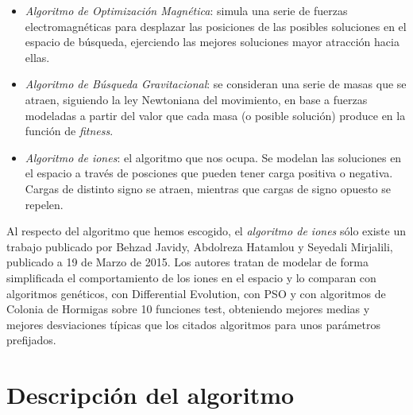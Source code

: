 \documentclass[a4paper,11pt]{article}
\begin{document}
\begin{itemize}
  \begin{itemize}
    \item \textit{Algoritmo de Optimización Magnética}: simula una serie de fuerzas electromagnéticas para desplazar las posiciones
    de las posibles soluciones en el espacio de búsqueda, ejerciendo las mejores soluciones mayor atracción hacia ellas.
    
    \item \textit{Algoritmo de Búsqueda Gravitacional}: se consideran una serie de masas que se atraen, siguiendo la ley
    Newtoniana del movimiento, en base a fuerzas modeladas a partir del valor que cada masa (o posible solución) produce
    en la función de \textit{fitness}.
    
    \item \textit{Algoritmo de iones}: el algoritmo que nos ocupa. Se modelan las soluciones en el espacio a través de posciones
    que pueden tener carga positiva o negativa. Cargas de distinto signo se atraen, mientras que cargas de signo opuesto se repelen.
  \end{itemize}
\end{itemize}

Al respecto del algoritmo que hemos escogido, el \textit{algoritmo de iones} sólo existe un trabajo publicado por Behzad Javidy, 
Abdolreza Hatamlou y Seyedali Mirjalili, publicado a 19 de Marzo de 2015. Los autores tratan de modelar de forma
simplificada el comportamiento de los iones en el espacio y lo comparan con algoritmos genéticos, con Differential Evolution,
con PSO y con algoritmos de Colonia de Hormigas sobre 10 funciones test, obteniendo mejores medias y mejores desviaciones
típicas que los citados algoritmos para unos parámetros prefijados.

\section{Descripción del algoritmo}
\end{document}
